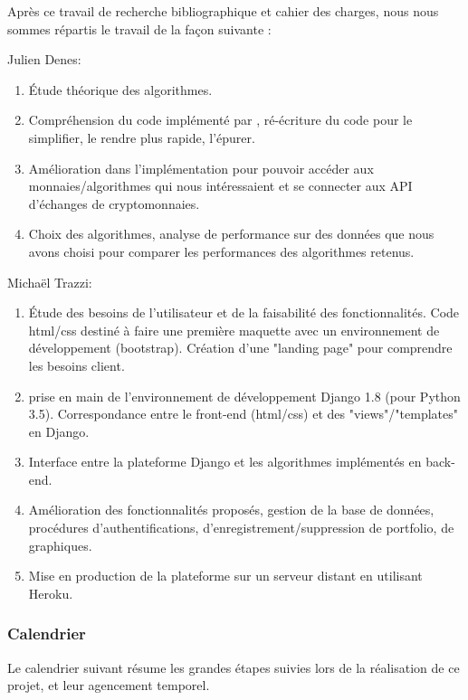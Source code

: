 \documentclass[a4paper, 10pt]{article}
\begin{document}
Après ce travail de recherche bibliographique et cahier des charges, nous nous sommes répartis le travail de la façon suivante :

\noindent Julien Denes:
\begin{enumerate}
    \item Étude théorique des algorithmes.
    \item Compréhension du code implémenté par \citet{Jiang2017}, ré-écriture du code pour le simplifier, le rendre plus rapide, l’épurer.
    \item Amélioration dans l’implémentation pour pouvoir accéder aux monnaies/algorithmes qui nous intéressaient et se connecter aux API d’échanges de cryptomonnaies.
    \item Choix des algorithmes, analyse de performance sur des données que nous avons choisi pour comparer les performances des algorithmes retenus.
\end{enumerate}
\vspace{0.25cm}
\noindent Michaël Trazzi:
\begin{enumerate}
    \item Étude des besoins de l’utilisateur et de la faisabilité des fonctionnalités. Code html/css destiné à faire une première maquette avec un environnement de développement (bootstrap). Création d’une "landing page" pour comprendre les besoins client.
    \item prise en main de l’environnement de développement Django 1.8 (pour Python 3.5). Correspondance entre le front-end (html/css) et des "views"/"templates" en Django.
    \item Interface entre la plateforme Django et les algorithmes implémentés en back-end.
    \item Amélioration des fonctionnalités proposés, gestion de la base de données, procédures d’authentifications, d’enregistrement/suppression de portfolio, de graphiques.
    \item Mise en production de la plateforme sur un serveur distant en utilisant Heroku.
\end{enumerate}

\subsubsection{Calendrier}
\label{sec:developpement_orga_calendrier}

Le calendrier suivant résume les grandes étapes suivies lors de la réalisation de ce projet, et leur agencement temporel.
\end{document}
